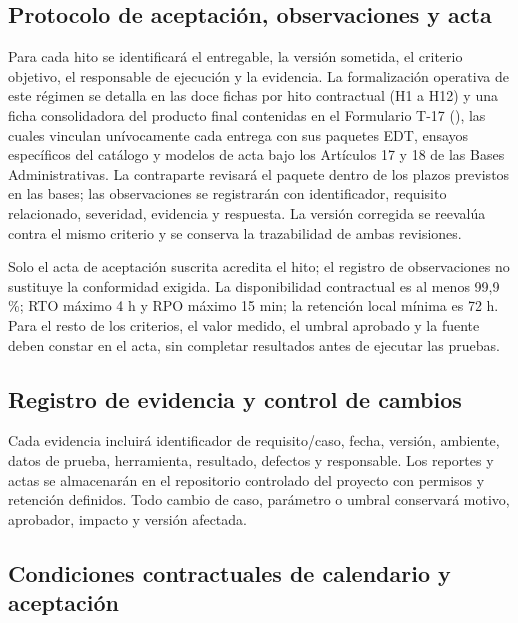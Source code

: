 \subsection{Protocolo de aceptación, observaciones y acta}\label{sec:9-protocolo-aceptacion}

Para cada hito se identificará el entregable, la versión sometida, el criterio objetivo, el responsable de ejecución y la evidencia. La formalización operativa de este régimen se detalla en las doce fichas por hito contractual (H1 a H12) y una ficha consolidadora del producto final contenidas en el Formulario T-17 (), las cuales vinculan unívocamente cada entrega con sus paquetes EDT, ensayos específicos del catálogo y modelos de acta bajo los Artículos 17 y 18 de las Bases Administrativas. La contraparte revisará el paquete dentro de los plazos previstos en las bases; las observaciones se registrarán con identificador, requisito relacionado, severidad, evidencia y respuesta. La versión corregida se reevalúa contra el mismo criterio y se conserva la trazabilidad de ambas revisiones.

Solo el acta de aceptación suscrita acredita el hito; el registro de observaciones no sustituye la conformidad exigida. La disponibilidad contractual es al menos 99,9\,\%; RTO máximo 4 h y RPO máximo 15 min; la retención local mínima es 72 h. Para el resto de los criterios, el valor medido, el umbral aprobado y la fuente deben constar en el acta, sin completar resultados antes de ejecutar las pruebas.

\subsection{Registro de evidencia y control de cambios}\label{sec:9-evidencias}

Cada evidencia incluirá identificador de requisito/caso, fecha, versión, ambiente, datos de prueba, herramienta, resultado, defectos y responsable. Los reportes y actas se almacenarán en el repositorio controlado del proyecto con permisos y retención definidos. Todo cambio de caso, parámetro o umbral conservará motivo, aprobador, impacto y versión afectada.

\subsection{Condiciones contractuales de calendario y aceptación}\label{sec:9-condiciones-contractuales}

